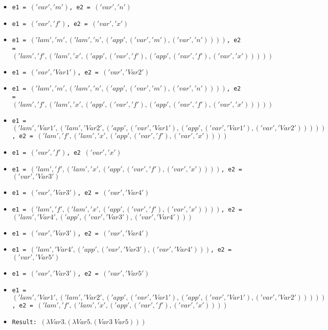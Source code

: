 \documentclass{article}
\theoremstyle{theorem}
\theoremstyle{definition}
\theoremstyle{remark}
\begin{document}
      \begin{itemize}
      \item \texttt{e1 = $('var', 'm')$, e2 = $('var', 'n')$}
      \item \texttt{e1 = $('var', 'f')$, e2 = $('var', 'x')$}
      \item \texttt{e1 = $('lam', 'm', ('lam', 'n', ('app', ('var', 'm'), ('var', 'n'))))$, \newline e2 = $('lam', 'f', ('lam', 'x', ('app', ('var', 'f'), ('app', ('var', 'f'), ('var', 'x')))))$}
      \item \texttt{e1 = $('var', 'Var1')$, e2 = $('var', 'Var2')$}
      \item \texttt{e1 = $('lam', 'm', ('lam', 'n', ('app', ('var', 'm'), ('var', 'n'))))$, \newline e2 = $('lam', 'f', ('lam', 'x', ('app', ('var', 'f'), ('app', ('var', 'f'), ('var', 'x')))))$}
      \item \texttt{e1 = $('lam', 'Var1', ('lam', 'Var2', ('app', ('var', 'Var1'), ('app', ('var', 'Var1'), ('var', 'Var2')))))$, \newline e2 = $('lam', 'f', ('lam', 'x', ('app', ('var', 'f'), ('var', 'x'))))$}
      \item \texttt{e1 = $('var', 'f')$, e2 $('var', 'x')$}
      \item \texttt{e1 = $('lam', 'f', ('lam', 'x', ('app', ('var', 'f'), ('var', 'x'))))$, e2 = $('var', 'Var3')$}
      \item \texttt{e1 = $('var', 'Var3')$, e2 = $('var', 'Var4')$}
      \item \texttt{e1 = $('lam', 'f', ('lam', 'x', ('app', ('var', 'f'), ('var', 'x'))))$, \newline e2 = $('lam', 'Var4', ('app', ('var', 'Var3'), ('var', 'Var4')))$}
      \item \texttt{e1 = $('var', 'Var3')$, e2 = $('var', 'Var4')$}
      \item \texttt{e1 = $('lam', 'Var4', ('app', ('var', 'Var3'), ('var', 'Var4')))$, e2 = $('var', 'Var5')$}
      \item \texttt{e1 = $('var', 'Var3')$, e2 = $('var', 'Var5')$}
      \item \texttt{e1 = $('lam', 'Var1', ('lam', 'Var2', ('app', ('var', 'Var1'), ('app', ('var', 'Var1'), ('var', 'Var2')))))$, \newline e2 = $('lam', 'f', ('lam', 'x', ('app', ('var', 'f'), ('var', 'x'))))$}
      \item \texttt{Result: $(\lambda Var3.(\lambda Var5.(Var3\; Var5)))$}
      \end{itemize}
\end{document}
